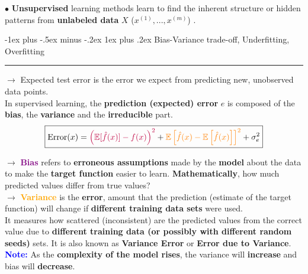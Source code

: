 \documentclass[letterpaper, 10.5pt,landscape]{article}
\makeatletter
\def\mathcolor#1#{\@mathcolor{#1}}
\def\@mathcolor#1#2#3{%
  \protect\leavevmode
  \begingroup
    \color#1{#2}#3%
  \endgroup
}
\renewcommand{\subsubsection}{\@startsection{subsubsection}{3}{0mm}%
                                {-1ex plus -.5ex minus -.2ex}%
                                {1ex plus .2ex}%
                                {\normalfont\small\bfseries}}
\makeatother
\begin{document}
\begin{multicols*}{3}
$\bullet$ \textbf{Unsupervised} learning methods learn to find the inherent structure or hidden patterns from \textbf{unlabeled data} 
 $X$ (\(x^{(1)}, ..., x^{(m)}\)) . 















\subsubsection{Bias-Variance trade-off, Underfitting, Overfitting} {\color{teal}\hrule height 0.5pt} \smallskip

$\rightarrow$ Expected test error is the error we expect from predicting new, unobserved data points. \\
In supervised learning, the \textbf{prediction (expected) error} $e$ is composed of the \textbf{bias}, the \textbf{variance} and the \textbf{irreducible} part.  
\vspace{-3pt}
\[\boxed{\text{Error}(x) =  \mathcolor{purple}{\left(\mathbb{E}[\hat{f}(x)] - f(x)\right)^{2}} + \mathcolor{orange}{\mathbb{E} \left[\hat{f}(x)- \mathbb{E}\left[\hat{f}(x)\right] \right]^{2}} + \sigma^{2}_{e}}\]
\vspace{-5pt}

$\rightarrow$ \textbf{\textcolor{purple}{Bias}} refers to \textbf{erroneous assumptions} made by the \textbf{model} about the data to make the \textbf{target function} easier to learn. \textbf{Mathematically}, how much predicted values differ from true values?
\\
$\rightarrow$ \textbf{\textcolor{orange}{Variance}} is the \textbf{error}, amount that the prediction (estimate of the target function) will change if \textbf{different training data sets} were used. \\

It measures how scattered (inconsistent) are the predicted values from the correct value due to \textbf{different training data (or possibly with different random seeds)} sets. It is also known as \textbf{Variance Error} or \textbf{Error due to Variance}. \\


\textbf{\textcolor{blue}{Note:}} As the \textbf{complexity of the model rises}, the variance will \textbf{increase} and bias will \textbf{decrease}.  \\


\end{multicols*}
\end{document}
